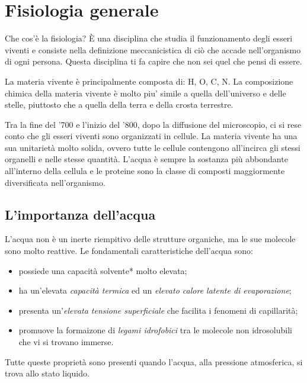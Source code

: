 \documentclass[]{article}
\date{}
\begin{document}
\section{Fisiologia generale}\label{fisiologia-generale}

Che cos'è la fisiologia? È una disciplina che studia il funzionamento
degli esseri viventi e consiste nella definizione meccanicistica di ciò
che accade nell'organismo di ogni persona. Questa disciplina ti fa
capire che non sei quel che pensi di essere.

La materia vivente è principalmente composta di: H, O, C, N. La
composizione chimica della materia vivente è molto piu' simile a quella
dell'universo e delle stelle, piuttosto che a quella della terra e della
crosta terrestre.

Tra la fine del '700 e l'inizio del '800, dopo la diffusione del
microscopio, ci si rese conto che gli esseri viventi sono organizzati in
cellule. La materia vivente ha una sua unitarietà molto solida, ovvero
tutte le cellule contengono all'incirca gli stessi organelli e nelle
stesse quantità. L'acqua è sempre la sostanza più abbondante all'interno
della cellula e le proteine sono la classe di composti maggiormente
diversificata nell'organismo.

\subsection{L'importanza dell'acqua}\label{limportanza-dellacqua}

L'acqua non è un inerte riempitivo delle strutture organiche, ma le sue
molecole sono molto reattive. Le fondamentali caratteristiche dell'acqua
sono:

\begin{itemize}
\itemsep1pt\parskip0pt
\item
  possiede una capacità solvente* molto elevata;
\item
  ha un'elevata \emph{capacità termica} ed un \emph{elevato calore
  latente di evaporazione};
\item
  presenta un'\emph{elevata tensione superficiale} che facilita i
  fenomeni di capillarità;
\item
  promuove la formaizone di \emph{legami idrofobici} tra le molecole non
  idrosolubili che vi si trovano immerse.
\end{itemize}

Tutte queste proprietà sono presenti quando l'acqua, alla pressione
atmosferica, si trova allo stato liquido.
\end{document}
